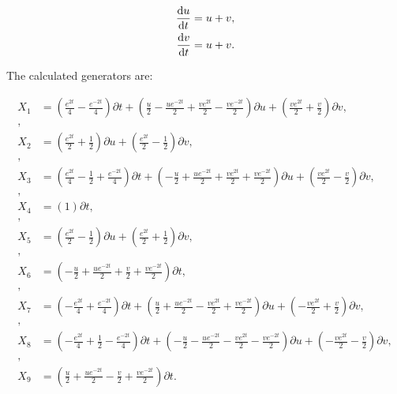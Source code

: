 \begin{align*}
\dv{u}{t}&=u + v,\\
\dv{v}{t}&=u + v.\\
\end{align*}

\noindent The calculated generators are:

\begin{align*}
X_{1}&=\left( \frac{e^{2 t}}{4} - \frac{e^{- 2 t}}{4} \right)\partial t+\left( \frac{u}{2} - \frac{u e^{- 2 t}}{2} + \frac{v e^{2 t}}{2} - \frac{v e^{- 2 t}}{2} \right)\partial u+\left( \frac{v e^{2 t}}{2} + \frac{v}{2} \right)\partial v,\\
,\\
X_{2}&=\left( \frac{e^{2 t}}{2} + \frac{1}{2} \right)\partial u+\left( \frac{e^{2 t}}{2} - \frac{1}{2} \right)\partial v,\\
,\\
X_{3}&=\left( \frac{e^{2 t}}{4} - \frac{1}{2} + \frac{e^{- 2 t}}{4} \right)\partial t+\left( - \frac{u}{2} + \frac{u e^{- 2 t}}{2} + \frac{v e^{2 t}}{2} + \frac{v e^{- 2 t}}{2} \right)\partial u+\left( \frac{v e^{2 t}}{2} - \frac{v}{2} \right)\partial v,\\
,\\
X_{4}&=\left( 1 \right)\partial t,\\
,\\
X_{5}&=\left( \frac{e^{2 t}}{2} - \frac{1}{2} \right)\partial u+\left( \frac{e^{2 t}}{2} + \frac{1}{2} \right)\partial v,\\
,\\
X_{6}&=\left( - \frac{u}{2} + \frac{u e^{- 2 t}}{2} + \frac{v}{2} + \frac{v e^{- 2 t}}{2} \right)\partial t,\\
,\\
X_{7}&=\left( - \frac{e^{2 t}}{4} + \frac{e^{- 2 t}}{4} \right)\partial t+\left( \frac{u}{2} + \frac{u e^{- 2 t}}{2} - \frac{v e^{2 t}}{2} + \frac{v e^{- 2 t}}{2} \right)\partial u+\left( - \frac{v e^{2 t}}{2} + \frac{v}{2} \right)\partial v,\\
,\\
X_{8}&=\left( - \frac{e^{2 t}}{4} + \frac{1}{2} - \frac{e^{- 2 t}}{4} \right)\partial t+\left( - \frac{u}{2} - \frac{u e^{- 2 t}}{2} - \frac{v e^{2 t}}{2} - \frac{v e^{- 2 t}}{2} \right)\partial u+\left( - \frac{v e^{2 t}}{2} - \frac{v}{2} \right)\partial v,\\
,\\
X_{9}&=\left( \frac{u}{2} + \frac{u e^{- 2 t}}{2} - \frac{v}{2} + \frac{v e^{- 2 t}}{2} \right)\partial t.\\
\end{align*}
